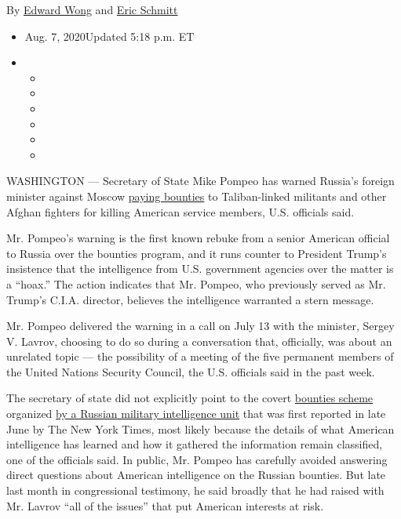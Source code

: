 By \href{https://www.nytimes3xbfgragh.onion/by/edward-wong}{Edward Wong}
and \href{https://www.nytimes3xbfgragh.onion/by/eric-schmitt}{Eric
Schmitt}

\begin{itemize}
\item
  Aug. 7, 2020Updated 5:18 p.m. ET
\item
  \begin{itemize}
  \item
  \item
  \item
  \item
  \item
  \item
  \end{itemize}
\end{itemize}

WASHINGTON --- Secretary of State Mike Pompeo has warned Russia's
foreign minister against Moscow
\href{https://www.nytimes3xbfgragh.onion/2020/06/26/us/politics/russia-afghanistan-bounties.html}{paying
bounties} to Taliban-linked militants and other Afghan fighters for
killing American service members, U.S. officials said.

Mr. Pompeo's warning is the first known rebuke from a senior American
official to Russia over the bounties program, and it runs counter to
President Trump's insistence that the intelligence from U.S. government
agencies over the matter is a ``hoax.'' The action indicates that Mr.
Pompeo, who previously served as Mr. Trump's C.I.A. director, believes
the intelligence warranted a stern message.

Mr. Pompeo delivered the warning in a call on July 13 with the minister,
Sergey V. Lavrov, choosing to do so during a conversation that,
officially, was about an unrelated topic --- the possibility of a
meeting of the five permanent members of the United Nations Security
Council, the U.S. officials said in the past week.

The secretary of state did not explicitly point to the covert
\href{https://www.nytimes3xbfgragh.onion/2020/06/26/us/politics/russia-afghanistan-bounties.html}{bounties
scheme} organized
\href{https://www.nytimes3xbfgragh.onion/2020/07/01/world/asia/afghan-russia-bounty-middleman.html}{by
a Russian military intelligence unit} that was first reported in late
June by The New York Times, most likely because the details of what
American intelligence has learned and how it gathered the information
remain classified, one of the officials said. In public, Mr. Pompeo has
carefully avoided answering direct questions about American intelligence
on the Russian bounties. But late last month in congressional testimony,
he said broadly that he had raised with Mr. Lavrov ``all of the issues''
that put American interests at risk.


